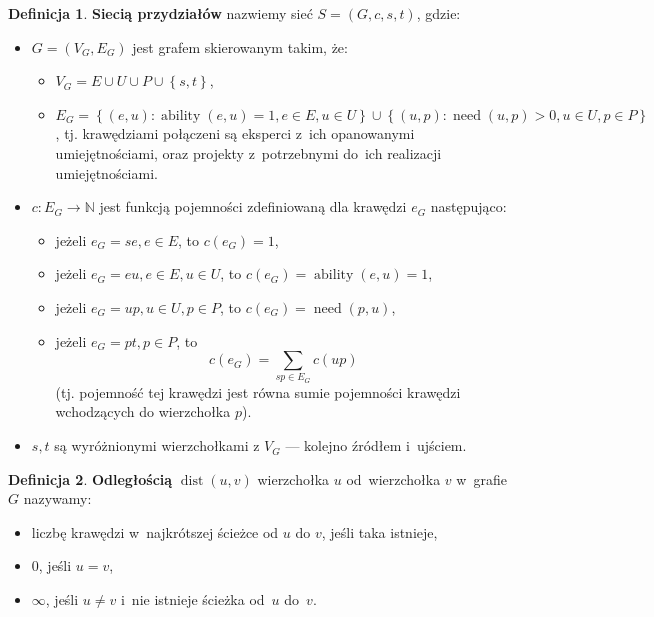 \documentclass[12pt,a4paper]{article}
\theoremstyle{definition}
\newtheorem{defn}{Definicja}
\DeclareMathOperator{\ability}{ability}
\DeclareMathOperator{\need}{need}
\DeclareMathOperator{\dist}{dist}
\begin{document}
\newpage
\begin{defn}
\label{defn:assignnetwork}
\textbf{Siecią przydziałów} nazwiemy sieć $S = \left(G,c,s,t\right)$, gdzie:
\begin{itemize}
	\item $G = \left(V_G,E_G\right)$ jest grafem skierowanym takim, że:
	\begin{itemize}
		\item $V_G = E \cup U \cup P \cup \left\lbrace s,t \right\rbrace$,
		\item $E_G = \left\lbrace (e,u) : \ability(e,u) = 1, e \in E, u \in U
		\right\rbrace \cup \left\lbrace (u,p) : \need(u,p) > 0, u \in U, p \in P
		\right\rbrace$, tj. krawędziami połączeni są eksperci z~ich opanowanymi
		umiejętnościami, oraz projekty z~potrzebnymi do~ich realizacji
		umiejętnościami.
	\end{itemize}
	\item $c : E_G \to \mathbb{N}$ jest funkcją pojemności zdefiniowaną
	dla krawędzi $e_G$ następująco:
	\begin{itemize}
		\item jeżeli $e_G = se, e \in E$, to $c(e_G) = 1$,
		\item jeżeli $e_G = eu, e \in E, u \in U$, to $c(e_G) = \ability(e,u) = 1$,
		\item jeżeli $e_G = up, u \in U, p \in P$, to $c(e_G) = \need(p,u)$,
		\item jeżeli $e_G = pt, p \in P$, to
		$$c(e_G) = \sum_{sp \in E_G} c(up)$$
		(tj. pojemność tej krawędzi jest równa sumie pojemności krawędzi
		wchodzących do wierzchołka $p$).
	\end{itemize}
	\item $s,t$ są wyróżnionymi wierzchołkami z $V_G$ --- kolejno źródłem
	i~ujściem.
\end{itemize}
\end{defn}

\begin{defn}
\textbf{Odległością} $\dist(u,v)$ wierzchołka $u$ od~wierzchołka $v$ w~grafie
$G$ nazywamy:
\begin{itemize}
	\item liczbę krawędzi w~najkrótszej ścieżce od $u$ do $v$, jeśli 
	taka istnieje,
	\item 0, jeśli $u = v$,
	\item $\infty$, jeśli $u \neq v$ i~nie istnieje ścieżka od~$u$ do~$v$.
\end{itemize}
\end{defn}
\end{document}
